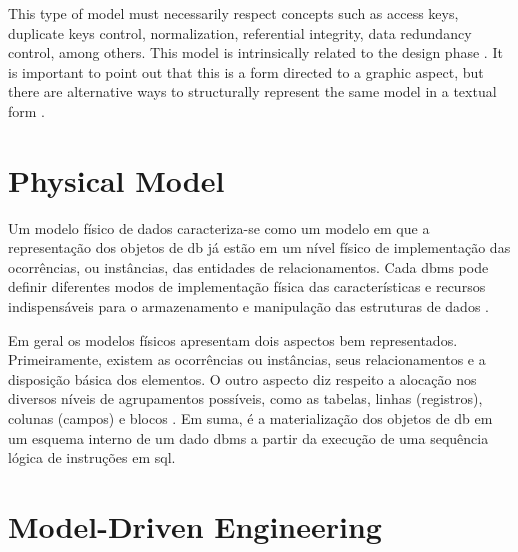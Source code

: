This type of model must necessarily respect concepts such as access keys, duplicate keys control, normalization, referential integrity, data redundancy control, among others.
This model is intrinsically related to the design phase \cite{Cougo:2013}.
It is important to point out that this is a form directed to a graphic aspect, but there are alternative ways to structurally represent the same model in a textual form \cite{Martelli:2018}.

\section{Physical Model}
\label{sec_back:physicalModel}

Um modelo físico de dados caracteriza-se como um modelo em que a representação dos objetos de \ac{db} já estão em um nível físico de implementação das ocorrências, ou instâncias, das entidades de relacionamentos. 
Cada \ac{dbms} pode definir diferentes modos de implementação física das características e recursos indispensáveis para o armazenamento e manipulação das estruturas de dados \cite{Cougo:2013}.

Em geral os modelos físicos apresentam dois aspectos bem representados. 
Primeiramente, existem as ocorrências ou instâncias, seus relacionamentos e a disposição básica dos elementos. 
O outro aspecto diz respeito a alocação nos diversos níveis de agrupamentos possíveis, como as tabelas, linhas (registros), colunas (campos) e blocos \cite{West:2011}.
Em suma, é a materialização dos objetos de \ac{db} em um esquema interno de um dado \ac{dbms} a partir da execução de uma sequência lógica de instruções em \ac{sql}.

\section{Model-Driven Engineering}
\label{sec_back:mde}


